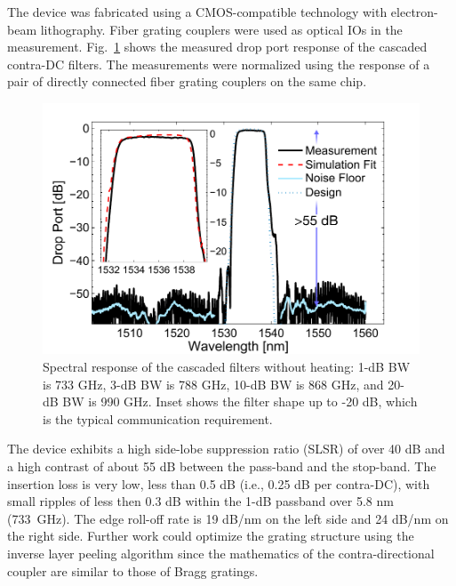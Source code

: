 \documentclass[osajnl,twocolumn,showpacs,superscriptaddress,10pt]{revtex4-1}
\begin{document}

The device was fabricated using a CMOS-compatible technology with electron-beam lithography. 
Fiber grating couplers\cite{zhong2014focusingFGC} were used as optical IOs in the measurement. 
Fig.~\ref{fig:passive} shows the measured drop port response of the cascaded contra-DC filters. 
The measurements were normalized using the response of a pair of directly connected fiber grating couplers on the same chip.
\begin{figure}[htbp]
\centering
\includegraphics[width=.99\columnwidth]{data/Passive61}
\caption{ Spectral response of the cascaded filters without heating: 1-dB BW is 733 GHz, 3-dB BW is 788 GHz, 10-dB BW is 868 GHz, and 20-dB BW is 990 GHz. Inset shows the filter shape up to -20 dB, which is the typical communication requirement.}
\label{fig:passive}
\end{figure}

The device exhibits a high side-lobe suppression ratio (SLSR) of over 40 dB and a high contrast of about 55 dB between the pass-band and the stop-band. 
The insertion loss is very low, less than 0.5 dB (i.e., 0.25 dB per contra-DC), with small ripples of less then 0.3 dB within the 1-dB passband over 5.8 nm (733~GHz). 
The edge roll-off rate is 19 dB/nm on the left side and 24 dB/nm on the right side.
Further work could optimize the grating structure using the inverse layer peeling algorithm\cite{skaar2001synthesis} since the mathematics of the contra-directional coupler are similar to those of Bragg gratings.
\end{document}
